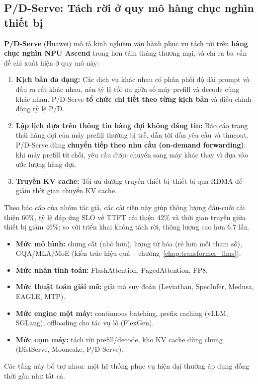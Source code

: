 \subsection{P/D-Serve: Tách rời ở quy mô hàng chục nghìn thiết bị}
\label{ssec:pdserve}
\textbf{P/D-Serve} \cite{jin2024pdserve} (Huawei) mô tả kinh nghiệm vận hành phục vụ tách rời trên \textbf{hàng chục nghìn NPU Ascend} trong hơn tám tháng thương mại, và chỉ ra ba vấn đề chỉ xuất hiện ở quy mô này:
\begin{enumerate}
	\item \textbf{Kịch bản đa dạng:} Các dịch vụ khác nhau có phân phối độ dài prompt và đầu ra rất khác nhau, nên tỷ lệ tối ưu giữa số máy prefill và decode cũng khác nhau. P/D-Serve \textbf{tổ chức chi tiết theo từng kịch bản} và điều chỉnh động tỷ lệ P/D.
	\item \textbf{Lập lịch dựa trên thông tin hàng đợi không đáng tin:} Báo cáo trạng thái hàng đợi của máy prefill thường bị trễ, dẫn tới dồn yêu cầu và timeout. P/D-Serve dùng \textbf{chuyển tiếp theo nhu cầu (on-demand forwarding)}: khi máy prefill từ chối, yêu cầu được chuyển sang máy khác thay vì dựa vào ước lượng hàng đợi.
	\item \textbf{Truyền KV cache:} Tối ưu đường truyền thiết bị--thiết bị qua RDMA để giảm thời gian chuyển KV cache.
\end{enumerate}
Theo báo cáo của nhóm tác giả, các cải tiến này giúp thông lượng đầu-cuối cải thiện 60\%, tỷ lệ đáp ứng SLO về TTFT cải thiện 42\% và thời gian truyền giữa thiết bị giảm 46\%; so với triển khai không tách rời, thông lượng cao hơn 6.7 lần.

\begin{tcolorbox}[title={Tổng kết: Bản đồ tối ưu hiệu quả LLM}, colback=green!5!white, colframe=green!60!black, fonttitle=\bfseries]
\begin{itemize}
	\item \textbf{Mức mô hình:} chưng cất (nhỏ hơn), lượng tử hóa (rẻ hơn mỗi tham số), GQA/MLA/MoE (kiến trúc hiệu quả -- chương~\ref{chap:transformer_llms}).
	\item \textbf{Mức nhân tính toán:} FlashAttention, PagedAttention, FP8.
	\item \textbf{Mức thuật toán giải mã:} giải mã suy đoán (Leviathan, SpecInfer, Medusa, EAGLE, MTP).
	\item \textbf{Mức engine một máy:} continuous batching, prefix caching (vLLM, SGLang), offloading cho tác vụ lô (FlexGen).
	\item \textbf{Mức cụm máy:} tách rời prefill/decode, kho KV cache dùng chung (DistServe, Mooncake, P/D-Serve).
\end{itemize}
Các tầng này bổ trợ nhau: một hệ thống phục vụ hiện đại thường áp dụng đồng thời gần như tất cả.
\end{tcolorbox}

